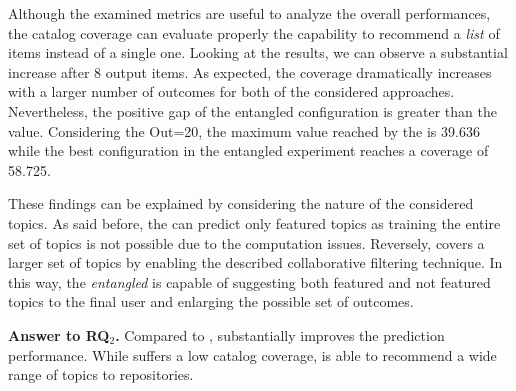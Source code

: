 Although the examined metrics are useful to analyze the overall performances, the catalog coverage can evaluate properly the capability to recommend a \emph{list} of items instead of a single one. Looking at the results, we can observe a substantial increase after 8 output items. As expected, the coverage dramatically increases with a larger number of outcomes for both of the considered approaches. Nevertheless, the positive gap of the entangled configuration is greater than the \MNB value. Considering the Out=20, the maximum value reached by the \MNB is 39.636 while the best configuration in the entangled experiment reaches a coverage of 58.725.

These findings can be explained by considering the nature of the considered topics. As said before, the \MNB can predict only featured topics as training the entire set of \GH topics is not possible due to the computation issues. Reversely, \TF covers a larger set of topics by enabling the described collaborative filtering technique. In this way, the \emph{entangled} is capable of suggesting both featured and not featured topics to the final user and enlarging the possible set of outcomes.



\begin{tcolorbox}[boxrule=0.86pt,left=0.3em, right=0.3em,top=0.1em, bottom=0.05em]
\textbf{Answer to RQ$_2$.} Compared to \MNB, \TFb substantially improves the prediction performance. While \MNB suffers a low catalog coverage, \TFb is able to recommend a wide range of topics to repositories.
\end{tcolorbox}










